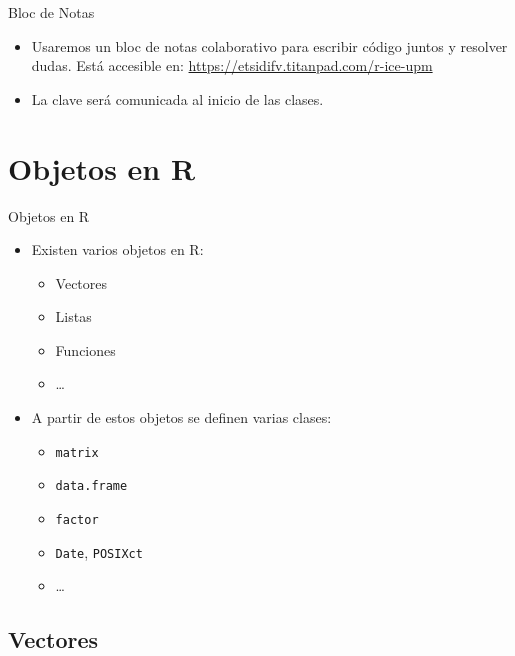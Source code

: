 \documentclass[xcolor={usenames,svgnames,dvipsnames}]{beamer}
\begin{document}
\begin{frame}[label=sec-1-2-6]{Bloc de Notas}
\begin{itemize}
\item Usaremos un bloc de notas colaborativo para escribir código juntos y resolver dudas. Está accesible en: \url{https://etsidifv.titanpad.com/r-ice-upm}

\item La clave será comunicada al inicio de las clases.
\end{itemize}
\end{frame}

\section{Objetos en R}
\label{sec-2}

\begin{frame}[fragile,label=sec-2-0-1]{Objetos en R}
 \begin{itemize}
\item Existen varios objetos en R:
\begin{itemize}
\item Vectores
\item Listas
\item Funciones
\item \ldots{}
\end{itemize}
\item A partir de estos objetos se definen varias clases:
\begin{itemize}
\item \texttt{matrix}
\item \texttt{data.frame}
\item \texttt{factor}
\item \texttt{Date}, \texttt{POSIXct}
\item \ldots{}
\end{itemize}
\end{itemize}
\end{frame}

\subsection{Vectores}
\label{sec-2-1}
\end{document}
